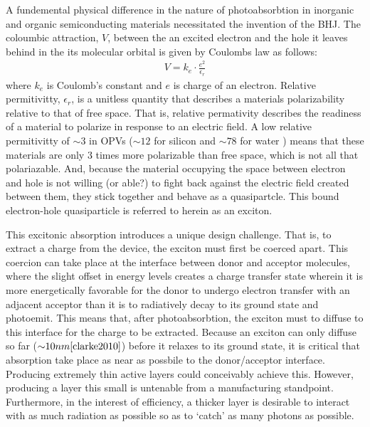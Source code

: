A fundemental physical difference in the nature of photoabsorbtion in inorganic and organic 
semiconducting materials necessitated the
invention of the BHJ. The coloumbic attraction, $V$, between the an excited
electron and the hole it leaves behind in the its molecular orbital
is given by Coulombs law as follows:
\begin{align}
    \label{coulomb}
    V  =  k_{e} \cdot \frac{e^{2}}{\epsilon_{r}}
\end{align}
where $k_{e}$ is Coulomb's constant and $e$ is charge of an electron. Relative permitivitty,
$\epsilon_{r}$, is a unitless quantity that describes a materials polarizability relative
to that of free space. That is, relative
permativity describes the readiness of a material
to polarize in response to an electric field. A low
relative permitivitty of ${\sim}3$ in OPVs (${\sim}12$ for silicon \cite{Baroni1986} and ${\sim}78$ for water \cite{George2004})
means that these materials are only $3$ times more polarizable than free space, which
is not all that polariazable. And, because the material occupying the space between electron and hole
is not willing (or able?) to fight back against the electric field created between them, they stick together and behave as a quasipartcle. 
This bound electron-hole quasiparticle is referred to herein as an exciton.

This excitonic absorption introduces a unique design challenge.
That is, to extract a charge from the device, the exciton
must first be coerced apart. This coercion can take place at the interface between donor and acceptor molecules,
where the slight offset in energy levels creates a charge transfer state wherein it is more
energetically favorable for the donor to undergo electron transfer with an adjacent acceptor than
it is to radiatively decay to its ground state and photoemit.
This means that, after photoabsorbtion, the exciton must to diffuse to this interface for the charge to be
extracted. Because an exciton can only diffuse so far (${\sim}10nm \cite{clarke2010}$) before it relaxes to
its ground state, it is critical that absorption take place as near as possbile to the donor/acceptor
interface. 
Producing extremely thin active layers could conceivably achieve this. However,
producing a layer this small is untenable from a manufacturing standpoint. Furthermore, in the interest of
efficiency, a thicker layer
is desirable to interact with as much radiation as possible so as to `catch' as many photons
as possible. 

